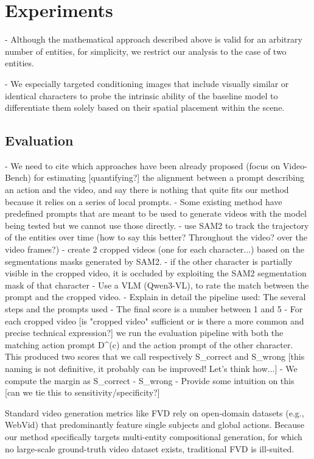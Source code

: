 \documentclass{article}
\begin{document}
\section{Experiments}

- Although the mathematical approach described above is valid for an arbitrary number of entities, for simplicity, we restrict our analysis to the case of two entities.

- We especially targeted conditioning images that include visually similar or identical characters to probe the intrinsic ability of the baseline model to differentiate them solely based on their spatial placement within the scene.

\subsection{Evaluation}
- We need to cite which approaches have been already proposed (focus on Video-Bench) for estimating [quantifying?] the alignment between a prompt describing an action and the video, and say there is nothing that quite fits our method because it relies on a series of local prompts.
  - Some existing method have predefined prompts that are meant to be used to generate videos with the model being tested but we cannot use those directly.
- use SAM2 to track the trajectory of the entities over time (how to say this better? Throughout the video? over the video frames?)
- create 2 cropped videos (one for each character...) based on the segmentations masks generated by SAM2.
- if the other character is partially visible in the cropped video, it is occluded by exploiting the SAM2 segmentation mask of that character
- Use a VLM (Qwen3-VL), to rate the match between the prompt and the cropped video.
  - Explain in detail the pipeline used: The several steps and the prompts used
  - The final score is a number between 1 and 5
  - For each cropped video [is "cropped video" sufficient or is there a more common and precise technical expression?]
  we run the evaluation pipeline with both the matching action prompt D^{(c)} and the action prompt of the other character. This produced two scores that we call respectively S_{correct} and S_{wrong} [this naming is not definitive, it probably can be improved! Let's think how...]
  - We compute the margin as S_{correct} - S_{wrong}
  - Provide some intuition on this [can we tie this to sensitivity/specificity?]


Standard video generation metrics like FVD rely on open-domain datasets (e.g., WebVid) that predominantly feature single subjects and global actions. Because our method specifically targets multi-entity compositional generation, for which no large-scale ground-truth video dataset exists, traditional FVD is ill-suited.
\end{document}
